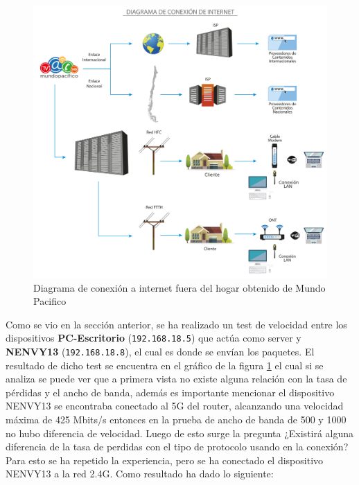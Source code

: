 \begin{figure}[!h]
	\centering
	\includegraphics[scale=0.9]{images/diagrama-conexxion-net.png}
	\caption{Diagrama de conexión a internet fuera del hogar obtenido de Mundo Pacifico \cite{Mundo} }
	\label{diag:iperf3}
\end{figure}

\noindent Como se vio en la sección anterior, se ha realizado un test de velocidad entre los dispositivos \textbf{PC-Escritorio} (\verb|192.168.18.5|) que actúa como server y \textbf{NENVY13} (\verb|192.168.18.8|), el cual es donde se envían los paquetes. El resultado de dicho test se encuentra en el gráfico de la figura \ref{diag:iperf3} el cual si se analiza se puede ver que a primera vista no existe alguna relación con la tasa de pérdidas y el ancho de banda, además es importante mencionar el dispositivo NENVY13 se encontraba conectado al 5G del router, alcanzando una velocidad máxima de 425 Mbits/s entonces en la prueba de ancho de banda de 500 y 1000 no hubo diferencia de velocidad. Luego de esto surge la pregunta ¿Existirá alguna diferencia de la tasa de perdidas con el tipo de protocolo usando en la conexión? Para esto se ha repetido la experiencia, pero se ha conectado el dispositivo NENVY13 a la red 2.4G. Como resultado ha dado lo siguiente: 

\newpage

